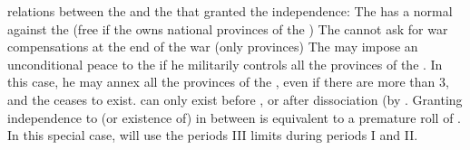 relations between the \MIN and the \MAJ that granted the independence:
\bparag The \MAJ has a normal \CB against the \MIN (free \CB if the \MIN owns
national provinces of the \MAJ)
\bparag The \MAJ cannot ask for war compensations at the end of the war (only
provinces)
\bparag The \MAJ may impose an unconditional peace to the \MIN if he
militarily controls all the provinces of the \MIN. In this case, he may annex
all the provinces of the \MIN, even if there are more than 3, and the \MIN
ceases to exist.
  can only exist before
, or after dissociation (by
. Granting independence to (or existence of)
 in between is equivalent to a premature roll of
.
\bparag In this special case, \HOL will use the periods III limits during
periods I and II.


